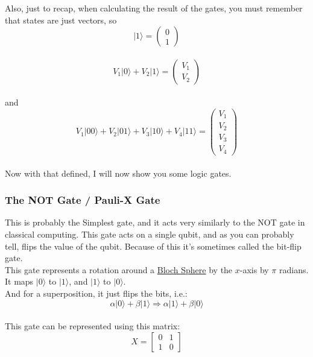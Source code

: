 \documentclass{report}
\begin{document}
Also, just to recap, when calculating the result of the gates, you must
remember that states are just vectors, so\\
\[\lvert1\rangle =\left( \begin{matrix} 0\\ 1\end{matrix} \right)\]\\
\[
V_1\lvert0\rangle + V_2\lvert1\rangle =\left( \begin{matrix} V_1\\ V_2\end{matrix} \right)\]\\
and\\
\[
V_1\lvert00\rangle + V_2\lvert01\rangle + V_3\lvert10\rangle + V_4\lvert11\rangle =\left( \begin{matrix} V_1\\V_2\\V_3\\ V_4\end{matrix} \right)\]\\
Now with that defined, I will now show you some logic gates.

\subsubsection{The NOT Gate / Pauli-X Gate}

This is probably the Simplest gate, and it acts very similarly to the NOT gate in classical computing.
This gate acts on a single qubit, and as you can probably tell, flips the value of the qubit.
Because of this it's sometimes called the bit-flip gate.\\
This gate represents a rotation around a
\href{https://en.wikipedia.org/wiki/Bloch_sphere}{Bloch Sphere} by the
\(x\)-axis by \(\pi\) radians.\\
It maps \(\lvert0\rangle\) to \(\lvert1\rangle\), and \(\lvert1\rangle\) to
\(\lvert0\rangle\).\\
And for a superposition, it just flips the bits, i.e.:\\
\[
\alpha\lvert0\rangle + \beta\lvert1\rangle \Rightarrow \alpha\lvert1\rangle + \beta\lvert0\rangle\]\\
This gate can be represented using this matrix:\\
\[X = \left[ \begin{matrix} 0 & 1\\1 & 0\end{matrix} \right]\]
\end{document}
